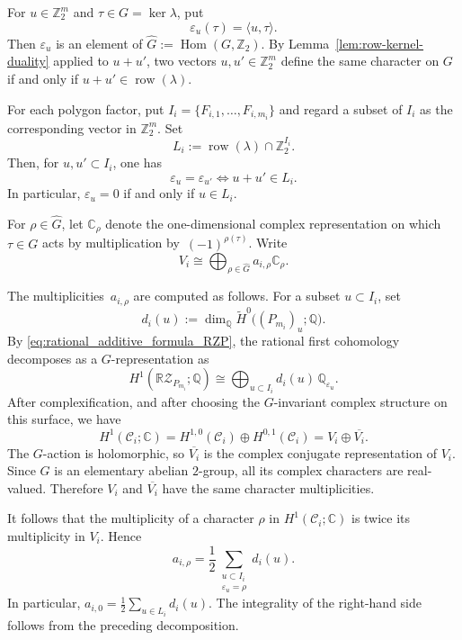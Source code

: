 \documentclass{amsart}
\numberwithin{equation}{section}
\theoremstyle{definition}
\theoremstyle{remark}
\newcommand{\Z}{\mathbb Z}
\newcommand{\C}{\mathbb C}
\newcommand{\Q}{\mathbb Q}
\newcommand{\cC}{\mathcal C}
\newcommand{\RZ}{\mathbb R\mathcal Z}
\DeclareMathOperator{\row}{row}
\DeclareMathOperator{\Hom}{Hom}
\begin{document}
For $u\in \Z_2^m$ and $\tau \in G = \ker\lambda$, put
$$
    \varepsilon_u (\tau) = \langle u, \tau \rangle.
$$
Then $\varepsilon_u$ is an element of $\widehat G:=\Hom(G,\Z_2)$.
By Lemma~\ref{lem:row-kernel-duality} applied to $u+u'$, two vectors $u,u'\in \Z_2^m$ define the same character on $G$ if and only if $u+u'\in \row(\lambda)$.

For each polygon factor, put $I_i=\{F_{i,1},\dots,F_{i,m_i}\}$ and regard a subset of $I_i$ as the corresponding vector in $\Z_2^m$.
Set
$$
    L_i:=\row(\lambda)\cap \Z_2^{I_i}.
$$
Then, for $u,u'\subset I_i$, one has
$$
    \varepsilon_u=\varepsilon_{u'} \iff u+u'\in L_i.
$$
In particular, $\varepsilon_u=0$ if and only if $u\in L_i$.

For $\rho\in\widehat G$, let $\C_\rho$ denote the one-dimensional complex representation on which $\tau \in G$ acts by multiplication by~$(-1)^{\rho(\tau)}$.
Write
\begin{equation}\label{eq:V_i}
    V_i\cong \bigoplus_{\rho\in\widehat G} a_{i,\rho} \C_\rho .
\end{equation}

The multiplicities~$a_{i,\rho}$ are computed as follows.
For a subset $u\subset I_i$, set
$$
    d_i(u):=\dim_\Q \widetilde H^0\bigl((P_{m_i})_u;\Q\bigr).
$$
By \eqref{eq:rational_additive_formula_RZP}, the rational first cohomology decomposes as a $G$-representation as
$$
    H^1(\RZ_{P_{m_i}};\Q) \cong \bigoplus_{u\subset I_i} d_i(u)\,\Q_{\varepsilon_u}. 
$$
After complexification, and after choosing the $G$-invariant complex structure on this surface, we have
$$
    H^1(\cC_i;\C) = H^{1,0}(\cC_i)\oplus H^{0,1}(\cC_i) =V_i\oplus \overline{V_i}.
$$
The $G$-action is holomorphic, so $\overline{V_i}$ is the complex conjugate representation of $V_i$.
Since $G$ is an elementary abelian $2$-group, all its complex characters are real-valued.
Therefore $V_i$ and $\overline{V_i}$ have the same character multiplicities.

It follows that the multiplicity of a character $\rho$ in $H^1(\cC_i;\C)$ is twice its multiplicity in $V_i$.
Hence
\begin{equation}\label{eq:a_irho}
    a_{i,\rho} = \frac12 \sum_{\substack{u\subset I_i\\ \varepsilon_u=\rho}} d_i(u).
\end{equation}
In particular, $a_{i,0}=\frac12 \sum_{u\in L_i} d_i(u)$.
The integrality of the right-hand side follows from the preceding decomposition.
\end{document}
